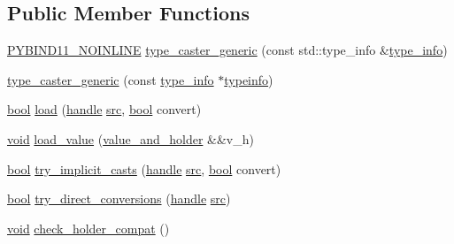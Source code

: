 \subsection*{Public Member Functions}
\begin{DoxyCompactItemize}
\item 
\mbox{\hyperlink{detail_2common_8h_a1fb186b7494d5c576d902c0730ecbb71}{P\+Y\+B\+I\+N\+D11\+\_\+\+N\+O\+I\+N\+L\+I\+NE}} \mbox{\hyperlink{classtype__caster__generic_a596f9ddd637dc921c7e19a1a8438f0a8}{type\+\_\+caster\+\_\+generic}} (const std\+::type\+\_\+info \&\mbox{\hyperlink{structtype__info}{type\+\_\+info}})
\item 
\mbox{\hyperlink{classtype__caster__generic_a1d732714e600767de350cb3c6c8bb291}{type\+\_\+caster\+\_\+generic}} (const \mbox{\hyperlink{structtype__info}{type\+\_\+info}} $\ast$\mbox{\hyperlink{classtype__caster__generic_ae0fcfb286c3f28721b89b077a9e1fe6d}{typeinfo}})
\item 
\mbox{\hyperlink{asdl_8h_af6a258d8f3ee5206d682d799316314b1}{bool}} \mbox{\hyperlink{classtype__caster__generic_aa841c81d370ff23ccafa8507cc01a0b1}{load}} (\mbox{\hyperlink{classhandle}{handle}} \mbox{\hyperlink{_s_d_l__opengl__glext_8h_a72e0fdf0f845ded60b1fada9e9195cd7}{src}}, \mbox{\hyperlink{asdl_8h_af6a258d8f3ee5206d682d799316314b1}{bool}} convert)
\item 
\mbox{\hyperlink{_s_d_l__opengles2__gl2ext_8h_ae5d8fa23ad07c48bb609509eae494c95}{void}} \mbox{\hyperlink{classtype__caster__generic_ad532f221c703a0b54ccee305988a46d4}{load\+\_\+value}} (\mbox{\hyperlink{structvalue__and__holder}{value\+\_\+and\+\_\+holder}} \&\&v\+\_\+h)
\item 
\mbox{\hyperlink{asdl_8h_af6a258d8f3ee5206d682d799316314b1}{bool}} \mbox{\hyperlink{classtype__caster__generic_a0a08f0af0579001f749a42d2671fb859}{try\+\_\+implicit\+\_\+casts}} (\mbox{\hyperlink{classhandle}{handle}} \mbox{\hyperlink{_s_d_l__opengl__glext_8h_a72e0fdf0f845ded60b1fada9e9195cd7}{src}}, \mbox{\hyperlink{asdl_8h_af6a258d8f3ee5206d682d799316314b1}{bool}} convert)
\item 
\mbox{\hyperlink{asdl_8h_af6a258d8f3ee5206d682d799316314b1}{bool}} \mbox{\hyperlink{classtype__caster__generic_a1192cfe91ebc0a78fa912b78a810a39a}{try\+\_\+direct\+\_\+conversions}} (\mbox{\hyperlink{classhandle}{handle}} \mbox{\hyperlink{_s_d_l__opengl__glext_8h_a72e0fdf0f845ded60b1fada9e9195cd7}{src}})
\item 
\mbox{\hyperlink{_s_d_l__opengles2__gl2ext_8h_ae5d8fa23ad07c48bb609509eae494c95}{void}} \mbox{\hyperlink{classtype__caster__generic_ac292948adb39e608d4ad380f3bb24f2c}{check\+\_\+holder\+\_\+compat}} ()

\end{DoxyCompactItemize}
